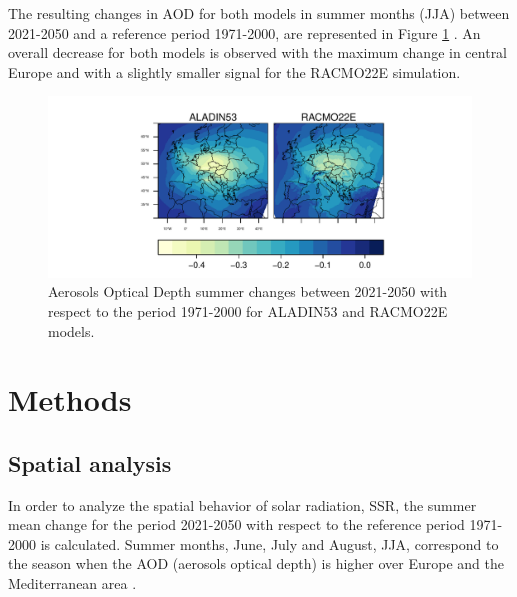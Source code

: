 The resulting changes in AOD for both models in summer months (JJA) between 2021-2050 and a reference period 1971-2000, are represented in Figure \ref{fig:aod} . An overall decrease for both models is observed with the maximum change in central Europe and with a slightly smaller signal for the RACMO22E simulation.

\begin{figure}[h!]
\centering\includegraphics[width=1\textwidth]{figs/capitulo7/ANOMALIAS_JJA_AOD_2050-2021_r12.pdf}
\caption[Aerosol optical depth summer change between 2050-2021 with respect to 1971-2000 over Europe]{Aerosols Optical Depth summer changes between 2021-2050 with respect to the period 1971-2000 for ALADIN53 and RACMO22E models.}
\label{fig:aod}
\end{figure}

{\section{Methods}\label{Methods}}

\subsection{Spatial analysis}

In order to analyze the spatial behavior of solar radiation, SSR, the summer mean change for the period 2021-2050 with respect to the reference period 1971-2000 is calculated. Summer months, June, July and August, JJA, correspond to the season when the AOD (aerosols optical depth) is higher over Europe and the Mediterranean area \cite*{Lelieveld}.



